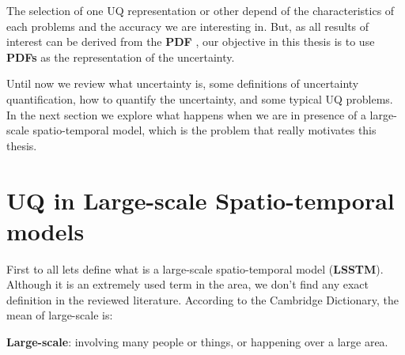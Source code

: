 The selection of one UQ representation or other depend of the characteristics of each problems and the accuracy we are interesting in. But, as all results of interest can be derived from the \textbf{PDF} \cite{Cox2012}, our objective in this thesis is to use \textbf{PDFs} as the representation of the uncertainty. 
 

%

Until now we review what uncertainty is, some definitions of uncertainty quantification, how to quantify the uncertainty, and some typical UQ problems. In the next section we explore what happens when we are in presence of a large-scale spatio-temporal model, which is the problem that really motivates this thesis.

\section{UQ in Large-scale Spatio-temporal models}\label{sec:uq_large_scale}
First to all lets define what is a large-scale spatio-temporal model (\textbf{LSSTM}). Although it is an extremely used term in the area, we don't find any exact definition in the reviewed literature. According to the Cambridge Dictionary, the mean of large-scale is:

\begin{defn}
\textbf{Large-scale}: involving many people or things, or happening over a large area.
\end{defn}

